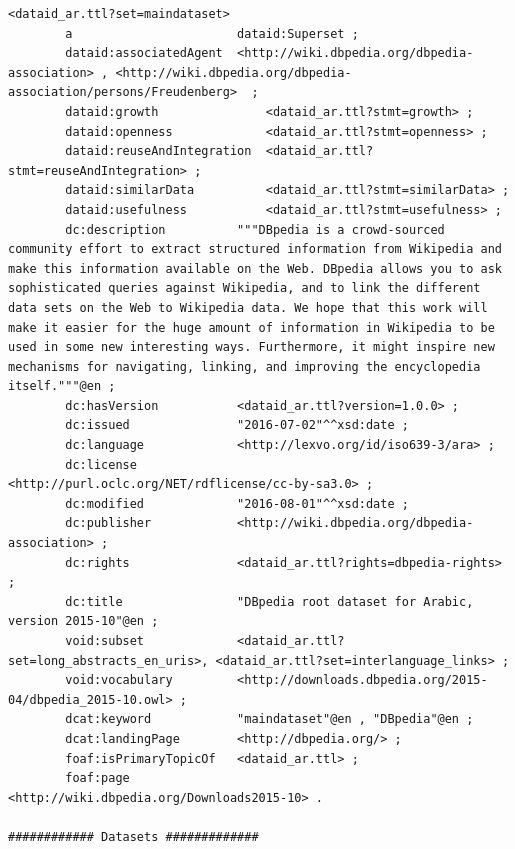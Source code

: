 \documentclass[a4paper,english,twoside,BCOR1.5cm,headsepline,DIV12,appendixprefix,final,12pt]{scrbook}
\begin{document}
\begin{lstlisting}[language=ttl, captionpos=b, label=lst:dcex,linewidth=\columnwidth,breaklines=true,basicstyle=\ttfamily\scriptsize]
<dataid_ar.ttl?set=maindataset>
        a                       dataid:Superset ;
        dataid:associatedAgent  <http://wiki.dbpedia.org/dbpedia-association> , <http://wiki.dbpedia.org/dbpedia-association/persons/Freudenberg>  ;
        dataid:growth               <dataid_ar.ttl?stmt=growth> ;
        dataid:openness             <dataid_ar.ttl?stmt=openness> ;
        dataid:reuseAndIntegration  <dataid_ar.ttl?stmt=reuseAndIntegration> ;
        dataid:similarData          <dataid_ar.ttl?stmt=similarData> ;
        dataid:usefulness           <dataid_ar.ttl?stmt=usefulness> ;
        dc:description          """DBpedia is a crowd-sourced community effort to extract structured information from Wikipedia and make this information available on the Web. DBpedia allows you to ask sophisticated queries against Wikipedia, and to link the different data sets on the Web to Wikipedia data. We hope that this work will make it easier for the huge amount of information in Wikipedia to be used in some new interesting ways. Furthermore, it might inspire new mechanisms for navigating, linking, and improving the encyclopedia itself."""@en ;
        dc:hasVersion           <dataid_ar.ttl?version=1.0.0> ;
        dc:issued               "2016-07-02"^^xsd:date ;
        dc:language             <http://lexvo.org/id/iso639-3/ara> ;
        dc:license              <http://purl.oclc.org/NET/rdflicense/cc-by-sa3.0> ;
        dc:modified             "2016-08-01"^^xsd:date ;
        dc:publisher            <http://wiki.dbpedia.org/dbpedia-association> ;
        dc:rights               <dataid_ar.ttl?rights=dbpedia-rights> ;
        dc:title                "DBpedia root dataset for Arabic, version 2015-10"@en ;
        void:subset             <dataid_ar.ttl?set=long_abstracts_en_uris>, <dataid_ar.ttl?set=interlanguage_links> ;
        void:vocabulary         <http://downloads.dbpedia.org/2015-04/dbpedia_2015-10.owl> ;
        dcat:keyword            "maindataset"@en , "DBpedia"@en ;
        dcat:landingPage        <http://dbpedia.org/> ;
        foaf:isPrimaryTopicOf   <dataid_ar.ttl> ;
        foaf:page               <http://wiki.dbpedia.org/Downloads2015-10> .

############ Datasets #############
     

\end{lstlisting}
\end{document}
